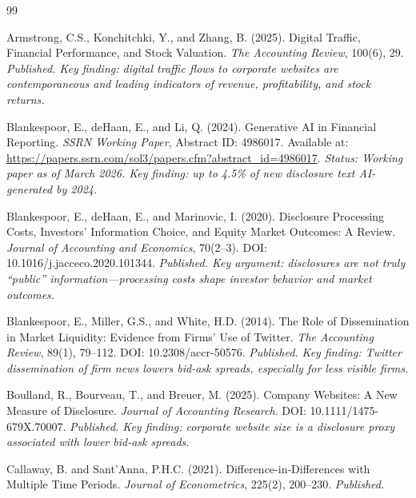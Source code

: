 \documentclass[12pt,a4paper]{article}
\begin{document}
\newpage
\begin{thebibliography}{99}

Armstrong, C.S., Konchitchki, Y., and Zhang, B. (2025).
\newblock Digital Traffic, Financial Performance, and Stock Valuation.
\newblock \emph{The Accounting Review}, 100(6), 29.
\newblock \textit{Published. Key finding: digital traffic flows to corporate websites are contemporaneous and leading indicators of revenue, profitability, and stock returns.}

Blankespoor, E., deHaan, E., and Li, Q. (2024).
\newblock Generative AI in Financial Reporting.
\newblock \emph{SSRN Working Paper}, Abstract ID: 4986017.
\newblock Available at: \url{https://papers.ssrn.com/sol3/papers.cfm?abstract_id=4986017}.
\newblock \textit{Status: Working paper as of March 2026. Key finding: up to 4.5\% of new disclosure text AI-generated by 2024.}

Blankespoor, E., deHaan, E., and Marinovic, I. (2020).
\newblock Disclosure Processing Costs, Investors' Information Choice, and Equity Market Outcomes: A Review.
\newblock \emph{Journal of Accounting and Economics}, 70(2--3).
\newblock DOI: 10.1016/j.jacceco.2020.101344.
\newblock \textit{Published. Key argument: disclosures are not truly ``public'' information---processing costs shape investor behavior and market outcomes.}

Blankespoor, E., Miller, G.S., and White, H.D. (2014).
\newblock The Role of Dissemination in Market Liquidity: Evidence from Firms' Use of Twitter.
\newblock \emph{The Accounting Review}, 89(1), 79--112.
\newblock DOI: 10.2308/accr-50576.
\newblock \textit{Published. Key finding: Twitter dissemination of firm news lowers bid-ask spreads, especially for less visible firms.}

Boulland, R., Bourveau, T., and Breuer, M. (2025).
\newblock Company Websites: A New Measure of Disclosure.
\newblock \emph{Journal of Accounting Research}.
\newblock DOI: 10.1111/1475-679X.70007.
\newblock \textit{Published. Key finding: corporate website size is a disclosure proxy associated with lower bid-ask spreads.}

Callaway, B. and Sant'Anna, P.H.C. (2021).
\newblock Difference-in-Differences with Multiple Time Periods.
\newblock \emph{Journal of Econometrics}, 225(2), 200--230.
\newblock \textit{Published.}


\end{thebibliography}
\end{document}
